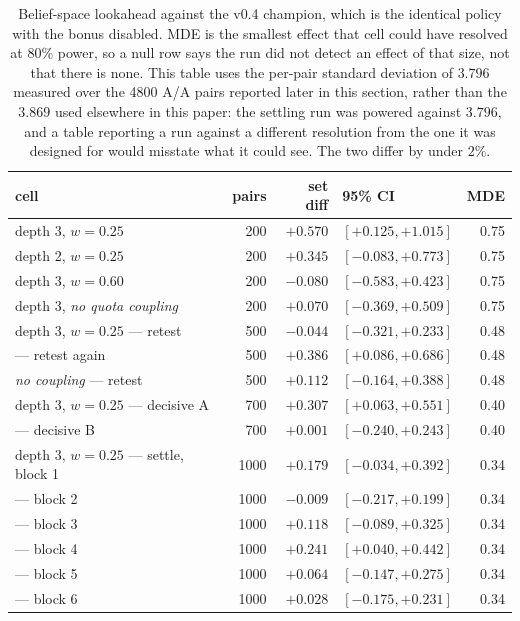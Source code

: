 \documentclass[11pt,a4paper]{article}
\begin{document}
\begin{table}[t]
\centering
\small
\begin{tabular}{lrrlr}
\toprule
cell & pairs & set diff & 95\% CI & MDE \\
\midrule
depth 3, $w=0.25$ & 200 & $\mathbf{+0.570}$ & $[+0.125, +1.015]$ & 0.75 \\
depth 2, $w=0.25$ & 200 & $+0.345$ & $[-0.083, +0.773]$ & 0.75 \\
depth 3, $w=0.60$ & 200 & $-0.080$ & $[-0.583, +0.423]$ & 0.75 \\
depth 3, \emph{no quota coupling} & 200 & $+0.070$ & $[-0.369, +0.509]$ & 0.75 \\
\midrule
depth 3, $w=0.25$ --- retest & 500 & $-0.044$ & $[-0.321, +0.233]$ & 0.48 \\
\midrule
\quad --- retest again & 500 & $\mathbf{+0.386}$ & $[+0.086, +0.686]$ & 0.48 \\
\midrule
\emph{no coupling} --- retest & 500 & $+0.112$ & $[-0.164, +0.388]$ & 0.48 \\
\midrule
depth 3, $w=0.25$ --- decisive A & 700 & $\mathbf{+0.307}$ & $[+0.063, +0.551]$ & 0.40 \\
\midrule
\quad --- decisive B & 700 & $+0.001$ & $[-0.240, +0.243]$ & 0.40 \\
depth 3, $w=0.25$ --- settle, block 1 & 1000 & $+0.179$ & $[-0.034, +0.392]$ & 0.34 \\
\quad --- block 2 & 1000 & $-0.009$ & $[-0.217, +0.199]$ & 0.34 \\
\quad --- block 3 & 1000 & $+0.118$ & $[-0.089, +0.325]$ & 0.34 \\
\quad --- block 4 & 1000 & $\mathbf{+0.241}$ & $[+0.040, +0.442]$ & 0.34 \\
\quad --- block 5 & 1000 & $+0.064$ & $[-0.147, +0.275]$ & 0.34 \\
\quad --- block 6 & 1000 & $+0.028$ & $[-0.175, +0.231]$ & 0.34 \\
\bottomrule
\end{tabular}
\caption{Belief-space lookahead against the v0.4 champion, which is the identical policy with the bonus disabled. MDE is the smallest effect that cell could have resolved at 80\% power, so a null row says the run did not detect an effect of that size, not that there is none. This table uses the per-pair standard deviation of $3.796$ measured over the 4800 A/A pairs reported later in this section, rather than the $3.869$ used elsewhere in this paper: the settling run was powered against $3.796$, and a table reporting a run against a different resolution from the one it was designed for would misstate what it could see. The two differ by under $2\%$.}
\label{tab:lookahead}
\end{table}
\end{document}
